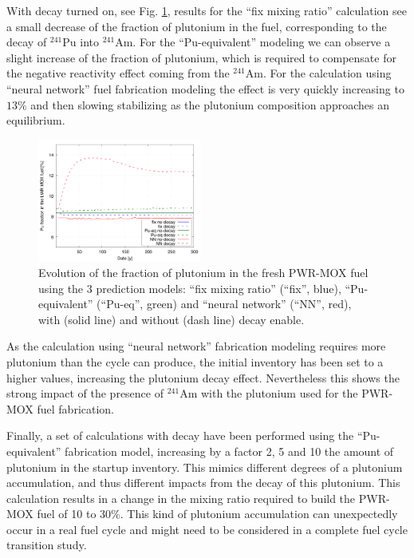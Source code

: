 \documentclass{anstrans}
\begin{document}
With decay turned on, see Fig. \ref{fig:d}, results for the ``fix mixing ratio''
calculation see a small decrease of the fraction of plutonium in the fuel,
corresponding to the decay of $^{241}$Pu into $^{241}$Am.  For the
``Pu-equivalent'' modeling we can observe a slight increase of the fraction of
plutonium, which is required to compensate for the negative reactivity effect
coming from the $^{241}$Am. For the calculation using ``neural network'' fuel
fabrication modeling the effect is very quickly increasing to $13\%$ and then
slowing stabilizing as the plutonium composition approaches an equilibrium.

\begin{figure}[h!] %
  \centering
  \includegraphics[width=0.48\textwidth]{decay_pu_contribution.png}
  \caption{Evolution of the fraction of plutonium in the fresh PWR-MOX fuel
    using the 3 prediction models: ``fix mixing ratio'' (``fix'', blue),
    ``Pu-equivalent'' (``Pu-eq'', green) and ``neural network'' (``NN'', red),
    with (solid line) and without (dash line) decay enable.} 
  \label{fig:d}
\end{figure}


As the calculation using ``neural network'' fabrication modeling requires more
plutonium than the cycle can produce, the initial inventory has been set to a
higher values, increasing the plutonium decay effect. Nevertheless this shows
the strong impact of the presence of $^{241}$Am with the plutonium used for the
PWR-MOX fuel fabrication.


Finally, a set of calculations with decay have been performed using the ``Pu-equivalent''
fabrication model, increasing by a factor 2, 5 and 10 the amount of plutonium in
the startup inventory. This mimics different degrees of a plutonium accumulation,
and thus different impacts from the decay of this plutonium.
This calculation results in a change in the mixing ratio required to build the
PWR-MOX fuel of 10 to 30\%. This kind of plutonium accumulation can
unexpectedly occur in a real fuel cycle and might need to be considered in a
complete fuel cycle transition study.
\end{document}
